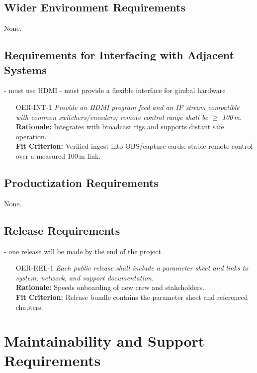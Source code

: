 \documentclass[12pt]{article}
\begin{document}
\subsection{Wider Environment Requirements}

None.

\subsection{Requirements for Interfacing with Adjacent Systems}

- must use HDMI
- must provide a flexible interface for gimbal hardware

\begin{itemize}[leftmargin=*]
  \item[OER-INT-1] \emph{Provide an HDMI program feed and an IP stream compatible with
          common switchers/encoders; remote control range shall be $\geq$ 100\,m.}\\
        \textbf{Rationale:} Integrates with broadcast rigs and supports distant safe
        operation.\\ \textbf{Fit Criterion:} Verified ingest into OBS/capture cards;
        stable remote control over a measured 100\,m link.
\end{itemize}

\subsection{Productization Requirements}

None.

\subsection{Release Requirements}

- one release will be made by the end of the project
\begin{itemize}[leftmargin=*]
  \item[OER-REL-1] \emph{Each public release shall include a parameter sheet and links
          to system, network, and support documentation.}\\ \textbf{Rationale:} Speeds
        onboarding of new crew and stakeholders.\\ \textbf{Fit Criterion:} Release
        bundle contains the parameter sheet and referenced chapters.
\end{itemize}

\section{Maintainability and Support Requirements}
\end{document}
